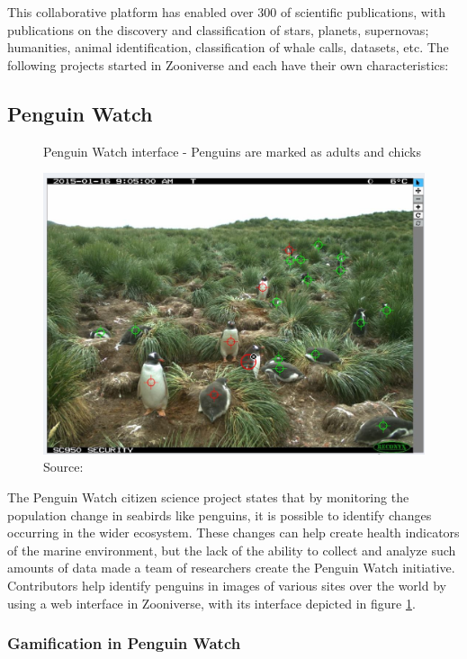 This collaborative platform has enabled over 300 of scientific publications, with publications on the discovery and classification of stars, planets, supernovas; humanities, animal identification, classification of whale calls, datasets, etc. The following projects started in Zooniverse and each have their own characteristics:

\subsection{Penguin Watch}

\begin{figure}[ht]
    \centering
    \caption{Penguin Watch interface - Penguins are marked as adults and chicks}
    \includegraphics[width=0.8\linewidth]{images/background/penguinwatch.jpg}
    \caption*{Source: \cite{penguin2015watch}}
    \label{fig:penguin-watch}
\end{figure}

The Penguin Watch citizen science project states that by monitoring the population change in seabirds like penguins, it is possible to identify changes occurring in the wider ecosystem. These changes can help create health indicators of the marine environment, but the lack of the ability to collect and analyze such amounts of data made a team of researchers create the Penguin Watch initiative. Contributors help identify penguins in images of various sites over the world by using a web interface in Zooniverse, with its interface depicted in figure \ref{fig:penguin-watch}.

\subsubsection{Gamification in Penguin Watch}

